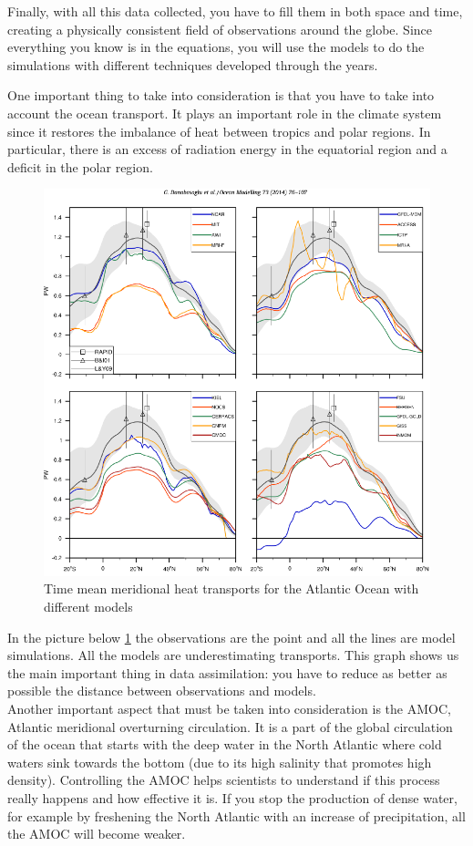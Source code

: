 Finally, with all this data collected, you have to fill them in both space and time, creating a physically consistent field of observations around the globe. Since everything you know is in the equations, you will use the models to do the simulations with different techniques developed through the years.


One important thing to take into consideration is that you have to take into account the ocean transport. It plays an important role in the climate system since it restores the imbalance of heat between tropics and polar regions. In particular, there is an excess of radiation energy in the equatorial region and a deficit in the polar region.
\begin{figure}[htpb]
	\centering
	\includegraphics[width=0.5\linewidth]{upload/image9.png}
	\caption{Time mean meridional heat transports for the Atlantic Ocean with different models}
	\label{fig:12}
\end{figure}
In the picture below \ref{fig:12} the observations are the point and all the lines are model simulations. All the models are underestimating transports.
This graph shows us the main important thing in data assimilation: you have to reduce as better as possible the distance between observations and models. \\






Another important aspect that must be taken into consideration is the AMOC, Atlantic meridional overturning circulation. It is a part of the global circulation of the ocean that starts with the deep water in the North Atlantic where cold waters sink towards the bottom (due to its high salinity that promotes high density).
Controlling the AMOC helps scientists to understand if this process really happens and how effective it is.
If you stop the production of dense water, for example by freshening the North Atlantic with an increase of precipitation, all the AMOC will become weaker.

